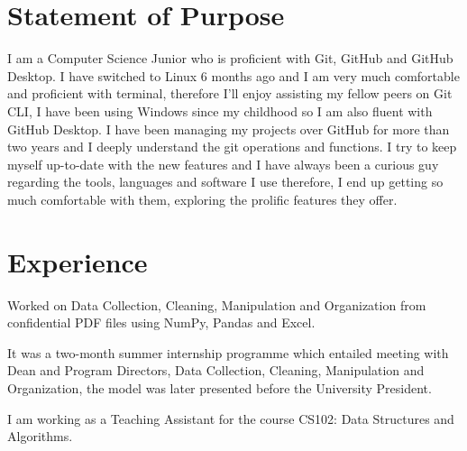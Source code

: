 \documentclass[]{m abbas resume' 2022}
\begin{document}
\begin{minipage}[t]{0.59\textwidth} 



    
\section{Statement of Purpose}
I am a Computer Science Junior who is proficient with Git, GitHub and GitHub
Desktop. I have switched to Linux 6 months ago and I am very much comfortable
and proficient with terminal, therefore I'll enjoy assisting my fellow peers on
Git CLI, I have been using Windows since my childhood so I am also fluent with
GitHub Desktop. I have been managing my projects over GitHub for more than two
years and I deeply understand the git operations and functions. I try to keep
myself up-to-date with the new features and I have always been a curious guy
regarding the tools, languages and software I use therefore, I end up getting
so much comfortable with them, exploring the prolific features they offer.



\section{Experience}
\vspace{\topsep} %
\begin{tightemize}
\sectionsep
\item Worked on Data Collection, Cleaning, Manipulation and Organization from confidential PDF files using NumPy, Pandas and Excel.
\item It was a two-month summer internship programme which entailed meeting with Dean and Program Directors, Data Collection, Cleaning, Manipulation and Organization, the model was later presented before the University President.
\end{tightemize}  
 

\begin{tightemize}
\sectionsep
\item I am working as a Teaching Assistant for the course CS102: Data Structures and Algorithms. 
\end{tightemize}  


\end{minipage}
\end{document}
